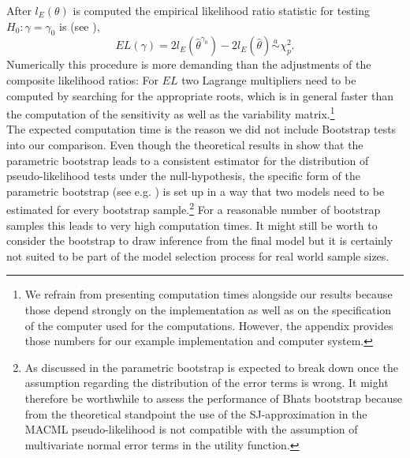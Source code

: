 \documentclass[12pt, a4paper]{article}
\numberwithin{defcounter}{section}
\numberwithin{excounter}{section}
\begin{document}
After $l_E(\theta)$ is computed the empirical likelihood ratio statistic for testing $H_0: \gamma ={\gamma_0}$ is (see \citep[307]{qin1994}),
\begin{equation*}
EL(\gamma) = 2l_E(\hat{\theta}^{\gamma_0}) - 2l_E(\hat{\theta}) \overset{a}{\sim} \chi_{p}^2.
\end{equation*}
%
Numerically this procedure is more demanding than the adjustments of the composite likelihood ratios: For $EL$ two Lagrange multipliers need to be computed by searching for the appropriate roots, which is in general faster than the computation of the sensitivity as well as the variability matrix.\footnote{We refrain from presenting computation times alongside our results because those depend strongly on the implementation as well as on the specification of the computer used for the computations. However, the appendix provides those numbers for our example implementation and computer system.}
\\
The expected computation time is the reason we did not include Bootstrap tests into our comparison. Even though the theoretical results in \cite{aerts1999} show that the parametric bootstrap leads to a consistent estimator for the distribution of pseudo-likelihood tests under the null-hypothesis, the specific form of the parametric bootstrap 
(see e.g. \cite{bhat2014}) is set up in a way that two models need to be estimated for every bootstrap sample.\footnote{As discussed in \citep[195]{molenberghs2005} the parametric bootstrap is expected to break down once the assumption regarding the distribution of the error terms is wrong. It might therefore be worthwhile to assess the performance of Bhats bootstrap because from the theoretical standpoint the use of the \ac{SJ}-approximation in the \ac{MACML} pseudo-likelihood is not compatible with the assumption of multivariate normal error terms in the utility function.} For a reasonable number of bootstrap samples this leads to very high computation times. It might still be worth to consider the bootstrap to draw inference from the final model but it is certainly not suited to be part of the model selection process for real world sample sizes.
\end{document}
